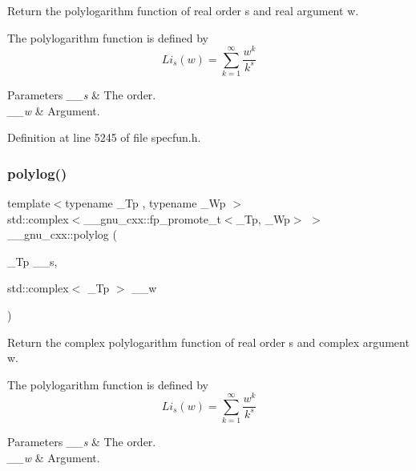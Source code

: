 Return the polylogarithm function of real order {\ttfamily s} and real argument {\ttfamily w}.

The polylogarithm function is defined by \[ Li_s(w) = \sum_{k=1}^{\infty} \frac{w^k}{k^s} \]


\begin{DoxyParams}{Parameters}
{\em \+\_\+\+\_\+s} & The order. \\
\hline
{\em \+\_\+\+\_\+w} & Argument. \\
\hline
\end{DoxyParams}


Definition at line 5245 of file specfun.\+h.

\mbox{\label{group__mathsf__gnu_ga817a208972a0200b667c68d199176d70}} 
\subsubsection{\texorpdfstring{polylog()}{polylog()}\hspace{0.1cm}{\footnotesize\ttfamily [2/2]}}
{\footnotesize\ttfamily template$<$typename \+\_\+\+Tp , typename \+\_\+\+Wp $>$ \\
std\+::complex$<$\+\_\+\+\_\+gnu\+\_\+cxx\+::fp\+\_\+promote\+\_\+t$<$\+\_\+\+Tp, \+\_\+\+Wp$>$ $>$ \+\_\+\+\_\+gnu\+\_\+cxx\+::polylog (\begin{DoxyParamCaption}\item[{\+\_\+\+Tp}]{\+\_\+\+\_\+s,  }\item[{std\+::complex$<$ \+\_\+\+Tp $>$}]{\+\_\+\+\_\+w }\end{DoxyParamCaption})\hspace{0.3cm}{\ttfamily [inline]}}

Return the complex polylogarithm function of real order {\ttfamily s} and complex argument {\ttfamily w}.

The polylogarithm function is defined by \[ Li_s(w) = \sum_{k=1}^{\infty} \frac{w^k}{k^s} \]


\begin{DoxyParams}{Parameters}
{\em \+\_\+\+\_\+s} & The order. \\
\hline
{\em \+\_\+\+\_\+w} & Argument. \\
\hline
\end{DoxyParams}


